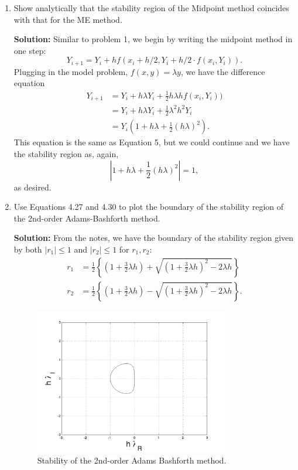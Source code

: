 \documentclass[11pt]{article}
\def\f{\frac }
\begin{document}
\begin{enumerate}
\pagebreak
\item Show analytically that the stability region of the Midpoint method coincides with that for the ME method.

\textbf{Solution:} Similar to problem 1, we begin by writing the midpoint method in one step:
\begin{equation} Y_{i+1} = Y_i + hf(x_i+h/2,Y_i + h/2\cdot f(x_i, Y_i)) .\end{equation}
Plugging in the model problem, $f(x,y) = \lambda y$, we have the difference equation
\begin{align} Y_{i+1} &= Y_i + h \lambda Y_i + \f{1}{2} h \lambda h f(x_i, Y_i))\\
&= Y_i + h  \lambda Y_i + \f{1}{2} \lambda^2 h^2 Y_i \\
&= Y_i \left( 1 + h  \lambda + \f{1}{2} (h\lambda)^2 \right ) \label{prb3eq1}.\end{align}
This equation is the same as Equation 5, but we could continue and we have the stability region as, again,
\begin{equation} \left | 1 + h  \lambda + \f{1}{2} (h\lambda)^2 \right | = 1 ,\end{equation}
as desired.

\clearpage
\newpage
\item Use Equations 4.27 and 4.30 to plot the boundary of the stability region of the 2nd-order Adams-Bashforth method.

\textbf{Solution:} From the notes, we have the boundary of the stability region given by both $| r_1 | \leq 1$ and $| r_2 | \leq 1$ for $r_1,r_2$:
\begin{align} r_1 &= \f{1}{2} \left \{ \left ( 1+ \frac{3}{2} \lambda h \right ) + \sqrt{\left ( 1 + \f{3}{2} \lambda h \right ) ^2 - 2\lambda h } \right \} \\
r_2 &= \f{1}{2} \left \{ \left ( 1+ \frac{3}{2} \lambda h \right ) - \sqrt{\left ( 1 + \f{3}{2} \lambda h \right ) ^2 - 2\lambda h } \right \} . \end{align}



\begin{figure}[h!]
  \centering
    \includegraphics[width=0.8\textwidth]{andy_hw04_prb04_02.png}
  \caption{Stability of the 2nd-order Adams Bashforth method.}
\end{figure}


\end{enumerate}
\end{document}
